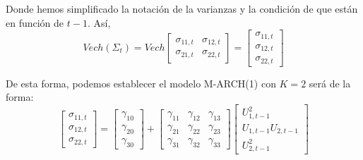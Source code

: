 \documentclass[
  a4paper,
]{article}
\begin{document}
Donde hemos simplificado la notación de la varianzas y la condición de
que están en función de \(t-1\). Así, \begin{equation*}
    Vech(\Sigma_{t}) = 
    Vech \begin{bmatrix}
    \sigma_{11, t} & \sigma_{12, t} \\ \sigma_{21, t} & \sigma_{22, t}
    \end{bmatrix} =
    \begin{bmatrix}
    \sigma_{11, t} \\ \sigma_{12, t} \\ \sigma_{22, t}
    \end{bmatrix}
\end{equation*}

De esta forma, podemos establecer el modelo M-ARCH(1) con \(K = 2\) será
de la forma: \begin{equation*}
    \begin{bmatrix}
    \sigma_{11, t} \\ \sigma_{12, t} \\ \sigma_{22, t}
    \end{bmatrix} =
    \begin{bmatrix}
    \gamma_{10} \\ \gamma_{20} \\ \gamma_{30}
    \end{bmatrix} +
    \begin{bmatrix}
    \gamma_{11} & \gamma_{12} & \gamma_{13} \\ \gamma_{21} & \gamma_{22} & \gamma_{23} \\ \gamma_{31} & \gamma_{32} & \gamma_{33}
    \end{bmatrix} 
    \begin{bmatrix}
    U^2_{1, t-1} \\ U_{1, t-1} U_{2, t-1} \\ U^2_{2, t-1}
    \end{bmatrix}
\end{equation*}
\end{document}
